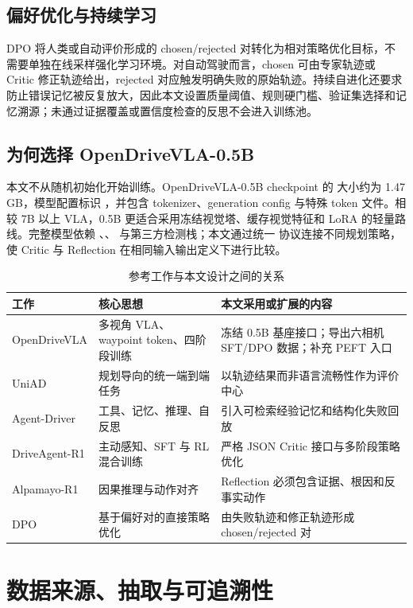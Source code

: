 \documentclass[UTF8,a4paper,12pt,fontset=fandol]{ctexart}
\begin{document}
\subsection{偏好优化与持续学习}
DPO 将人类或自动评价形成的 chosen/rejected 对转化为相对策略优化目标，不需要单独在线采样强化学习环境。对自动驾驶而言，chosen 可由专家轨迹或 Critic 修正轨迹给出，rejected 对应触发明确失败的原始轨迹。持续自进化还要求防止错误记忆被反复放大，因此本文设置质量阈值、规则硬门槛、验证集选择和记忆溯源；未通过证据覆盖或置信度检查的反思不会进入训练池。

\subsection{为何选择 OpenDriveVLA-0.5B}
本文不从随机初始化开始训练。OpenDriveVLA-0.5B checkpoint 的  大小约为 1.47 GB，模型配置标识 ，并包含 tokenizer、generation config 与特殊 token 文件。相较 7B 以上 VLA，0.5B 更适合采用冻结视觉塔、缓存视觉特征和 LoRA 的轻量路线。完整模型依赖 、、 与第三方检测栈；本文通过统一  协议连接不同规划策略，使 Critic 与 Reflection 在相同输入输出定义下进行比较。

\begin{table}[!htbp]
\centering\small
\caption{参考工作与本文设计之间的关系}
\begin{tabular}{P{0.18\textwidth}P{0.29\textwidth}P{0.39\textwidth}}
\toprule
工作 & 核心思想 & 本文采用或扩展的内容 \\
\midrule
OpenDriveVLA & 多视角 VLA、waypoint token、四阶段训练 & 冻结 0.5B 基座接口；导出六相机 SFT/DPO 数据；补充 PEFT 入口 \\
UniAD & 规划导向的统一端到端任务 & 以轨迹结果而非语言流畅性作为评价中心 \\
Agent-Driver & 工具、记忆、推理、自反思 & 引入可检索经验记忆和结构化失败回放 \\
DriveAgent-R1 & 主动感知、SFT 与 RL 混合训练 & 严格 JSON Critic 接口与多阶段策略优化 \\
Alpamayo-R1 & 因果推理与动作对齐 & Reflection 必须包含证据、根因和反事实动作 \\
DPO & 基于偏好对的直接策略优化 & 由失败轨迹和修正轨迹形成 chosen/rejected 对 \\
\bottomrule
\end{tabular}
\end{table}

\section{数据来源、抽取与可追溯性}
\end{document}
